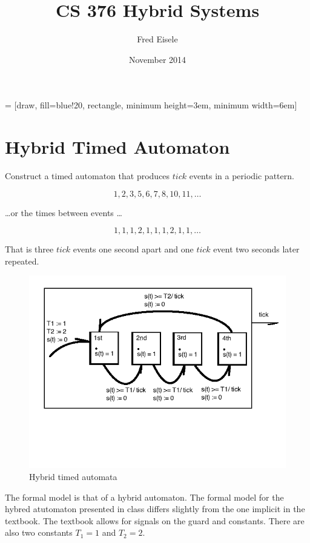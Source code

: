 \documentclass{article}
\title{CS 376 Hybrid Systems}
\author{Fred Eisele}
\date{November 2014}
\begin{document}
\maketitle

 = [draw, fill=blue!20, rectangle,
    minimum height=3em, minimum width=6em]


\section{Hybrid Timed Automaton}
Construct a timed automaton that produces $tick$
events in a periodic pattern.

\begin{equation}
1, 2, 3, 5, 6, 7 ,8, 10, 11, \ldots
\end{equation}

\ldots or the times between events \ldots

\begin{equation}
1, 1, 1, 2, 1, 1, 1, 2, 1, 1, \ldots
\end{equation}

That is three $tick$ events one second apart
and one $tick$ event two seconds later repeated.

\begin{figure}[h!]
\centering
\includegraphics[scale=0.7]{hw7_1_actor_detail.png}
\caption{Hybrid timed automata}
\label{fig:time_automata}
\end{figure}

The formal model is that of a hybrid automaton.
The formal model for the hybred atutomaton presented in
class differs slightly from the one implicit in the textbook.
The textbook allows for signals on the guard and constants.
There are also two constants $T_1 = 1$ and $T_2 = 2$.
\end{document}
